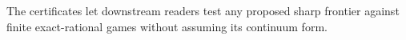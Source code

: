The certificates let downstream readers test any proposed sharp frontier against finite exact-rational games without assuming its continuum form.